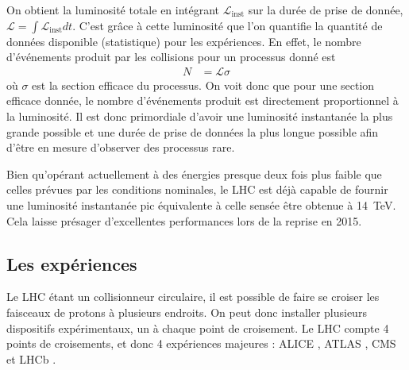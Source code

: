 \medskip

On obtient la luminosité totale en intégrant $\mathcal{L}_{\text{inst}}$ sur la durée de prise de donnée, $\mathcal{L} = \int \mathcal{L}_\text{inst} dt$. C'est grâce à cette luminosité que l'on quantifie la quantité de données disponible (statistique) pour les expériences. En effet, le nombre d'événements produit par les collisions pour un processus donné est
\begin{align*}
  N &= \mathcal{L} \sigma
\end{align*}
où $\sigma$ est la section efficace du processus. On voit donc que pour une section efficace donnée, le nombre d'événements produit est directement proportionnel à la luminosité. Il est donc primordiale d'avoir une luminosité instantanée la plus grande possible et une durée de prise de données la plus longue possible afin d'être en mesure d'observer des processus rare.

\bigskip

Bien qu'opérant actuellement à des énergies presque deux fois plus faible que celles prévues par les conditions nominales, le LHC est déjà capable de fournir une luminosité instantanée pic équivalente à celle sensée être obtenue à \SI{14}{\TeV}. Cela laisse présager d'excellentes performances lors de la reprise en 2015.

\subsection{Les expériences}

Le LHC étant un collisionneur circulaire, il est possible de faire se croiser les faisceaux de protons à plusieurs endroits. On peut donc installer plusieurs dispositifs expérimentaux, un à chaque point de croisement. Le LHC compte 4 points de croisements, et donc 4 expériences majeures : ALICE \citep{alice}, ATLAS \citep{atlas}, CMS \citep{cms} et LHCb \citep{lhcb}.

